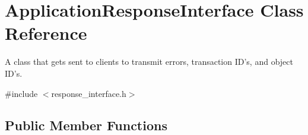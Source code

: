 \hypertarget{classApplicationResponseInterface}{\section{Application\-Response\-Interface Class Reference}
\label{classApplicationResponseInterface}
}


A class that gets sent to clients to transmit errors, transaction I\-D's, and object I\-D's.  




{\ttfamily \#include $<$response\-\_\-interface.\-h$>$}

\subsection*{Public Member Functions}
